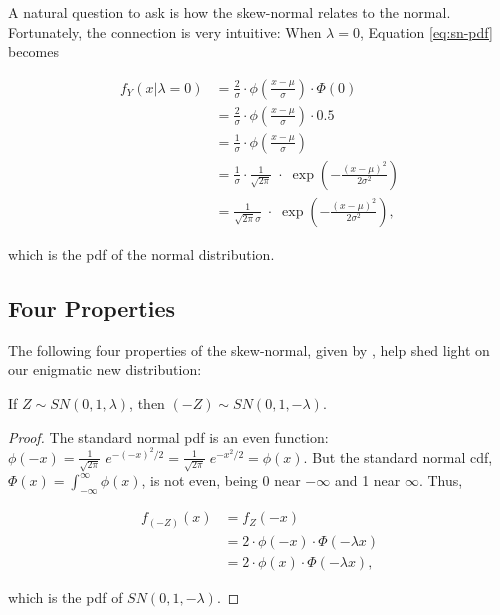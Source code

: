 A natural question to ask is how the skew-normal relates to the normal.
Fortunately, the connection is very intuitive: When $\lambda = 0$, Equation
\eqref{eq:sn-pdf} becomes

\begin{align*}
  f_Y(x|\lambda=0) &= \frac2\sigma \cdot \phi \left( \frac{x-\mu}{\sigma} \right) \cdot \Phi(0) \\
  &= \frac2\sigma \cdot \phi \left( \frac{x-\mu}{\sigma} \right) \cdot 0.5 \\
  &= \frac1\sigma \cdot \phi \left( \frac{x-\mu}{\sigma} \right) \\
  &= \frac1\sigma \cdot \frac{1}{\sqrt{2\pi}} \;\cdot\; \exp \left( -\frac{(x-\mu)^2}{2\sigma^2} \right) \\
  &= \frac{1}{\sqrt{2\pi}\sigma} \;\cdot\; \exp \left( -\frac{(x-\mu)^2}{2\sigma^2} \right),
\end{align*}

which is the pdf of the normal distribution.

\subsection{Four Properties}
\label{subsec:four-properties}

The following four properties of the skew-normal, given by \citet{main}, help
shed light on our enigmatic new distribution:

\begin{property} \label{prop:1}
  If $Z \sim SN(0, 1, \lambda)$, then $(-Z) \sim SN(0, 1, -\lambda)$.
\end{property}

\begin{proof}
  The standard normal pdf is an even function: $\phi(-x) =
  \frac{1}{\sqrt{2\pi}}\;e^{-(-x)^2/2} = \frac{1}{\sqrt{2\pi}}\;e^{-x^2/2} =
  \phi(x)$. But the standard normal cdf, \thinspace $\Phi(x) =
  \int_{-\infty}^\infty \phi(x)$, \thinspace is not even, being 0 near
  $-\infty$ and 1 near $\infty$. Thus,
  
  \begin{align*}
    f_{(-Z)}(x) &= f_Z(-x) \\
    & = 2 \cdot \phi(-x) \cdot \Phi (-\lambda x) \\
    & = 2 \cdot \phi(x) \cdot \Phi (-\lambda x),
  \end{align*}

  which is the pdf of $SN(0, 1, -\lambda)$.
\end{proof}

